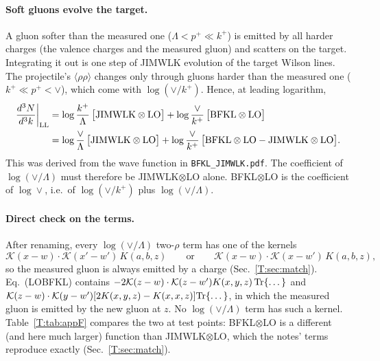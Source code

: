 \documentclass[10pt]{article}
\numberwithin{equation}{section}
\newcommand{\KK}{\mathcal K}
\newcommand{\Tr}{{\rm Tr}}
\begin{document}
\paragraph{Soft gluons evolve the target.} A gluon softer than the measured one ($\Lambda<p^+\ll k^+$) is emitted by all harder charges (the valence charges and the measured gluon) and scatters on the target. Integrating it out is one step of JIMWLK evolution of the target Wilson lines. The projectile's $\langle\rho\rho\rangle$ changes only through gluons harder than the measured one ($k^+\ll p^+<\vee$), which come with $\log(\vee/k^+)$. Hence, at leading logarithm,
\begin{align}
\frac{d^3N}{d^3k}\bigg|_{\rm LL}&=\log\frac{k^+}{\Lambda}\,\big[\text{JIMWLK}\otimes\text{LO}\big]+\log\frac{\vee}{k^+}\,\big[\text{BFKL}\otimes\text{LO}\big]\notag\\
&=\log\frac{\vee}{\Lambda}\,\big[\text{JIMWLK}\otimes\text{LO}\big]+\log\frac{\vee}{k^+}\,\big[\text{BFKL}\otimes\text{LO}-\text{JIMWLK}\otimes\text{LO}\big].
\label{T:eq:LL}
\end{align}
This was derived from the wave function in \texttt{BFKL\_JIMWLK.pdf}. The coefficient of $\log(\vee/\Lambda)$ must therefore be JIMWLK$\otimes$LO alone. BFKL$\otimes$LO is the coefficient of $\log\vee$, i.e.\ of $\log(\vee/k^+)$ plus $\log(\vee/\Lambda)$.

\paragraph{Direct check on the terms.} After renaming, every $\log(\vee/\Lambda)$ two-$\rho$ term has one of the kernels
\begin{equation}
\KK(x-w)\cdot\KK(x'-w')\,K(a,b,z)\qquad\text{or}\qquad \KK(x-w)\cdot\KK(x-w')\,K(a,b,z),
\end{equation}
so the measured gluon is always emitted by a charge (Sec.~\ref{T:sec:match}). Eq.~(LOBFKL) contains $-2\KK(z-w)\cdot\KK(z-w')K(x,y,z)\,\Tr\{\dots\}$ and $\KK(z-w)\cdot\KK(y-w')[2K(x,y,z)-K(x,x,z)]\Tr\{\dots\}$, in which the measured gluon is emitted by the new gluon at $z$. No $\log(\vee/\Lambda)$ term has such a kernel. Table~\ref{T:tab:appF} compares the two at test points: BFKL$\otimes$LO is a different (and here much larger) function than JIMWLK$\otimes$LO, which the notes' terms reproduce exactly (Sec.~\ref{T:sec:match}).
\end{document}
